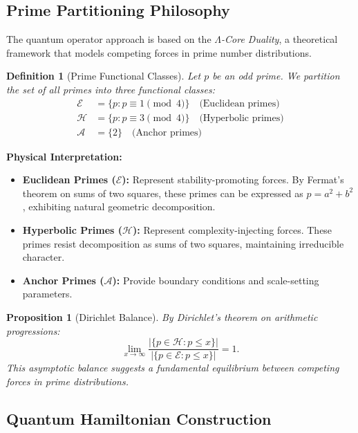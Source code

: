 \documentclass[12pt]{article}
\newtheorem{proposition}[theorem]{Proposition}
\newtheorem{definition}[theorem]{Definition}
\begin{document}
\subsection{Prime Partitioning Philosophy}

The quantum operator approach is based on the \textit{$\Lambda$-Core Duality}, a theoretical framework that models competing forces in prime number distributions.

\begin{definition}[Prime Functional Classes]
Let $p$ be an odd prime. We partition the set of all primes into three functional classes:
\begin{align}
\mathcal{E} &= \{p : p \equiv 1 \pmod{4}\} \quad \text{(Euclidean primes)} \\
\mathcal{H} &= \{p : p \equiv 3 \pmod{4}\} \quad \text{(Hyperbolic primes)} \\
\mathcal{A} &= \{2\} \quad \text{(Anchor primes)}
\end{align}
\end{definition}

\textbf{Physical Interpretation:}
\begin{itemize}
\item \textbf{Euclidean Primes ($\mathcal{E}$):} Represent stability-promoting forces. By Fermat's theorem on sums of two squares, these primes can be expressed as $p = a^2 + b^2$, exhibiting natural geometric decomposition.
\item \textbf{Hyperbolic Primes ($\mathcal{H}$):} Represent complexity-injecting forces. These primes resist decomposition as sums of two squares, maintaining irreducible character.
\item \textbf{Anchor Primes ($\mathcal{A}$):} Provide boundary conditions and scale-setting parameters.
\end{itemize}

\begin{proposition}[Dirichlet Balance]
By Dirichlet's theorem on arithmetic progressions:
\begin{equation}
\lim_{x \to \infty} \frac{|\{p \in \mathcal{H} : p \leq x\}|}{|\{p \in \mathcal{E} : p \leq x\}|} = 1.
\end{equation}
This asymptotic balance suggests a fundamental equilibrium between competing forces in prime distributions.
\end{proposition}

\subsection{Quantum Hamiltonian Construction}
\end{document}
